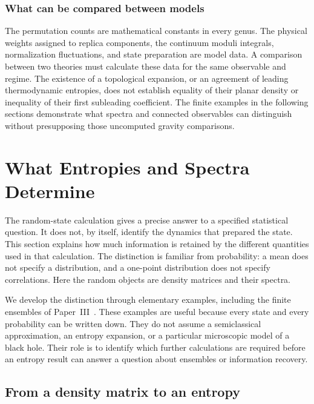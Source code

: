 \documentclass[11pt,letterpaper]{article}
\theoremstyle{plain}
\theoremstyle{definition}
\theoremstyle{remark}
\begin{document}
\subsubsection{What can be compared between models}
The permutation counts are mathematical constants in every genus.  The
physical weights assigned to replica components, the continuum moduli
integrals, normalization fluctuations, and state preparation are model data.
A comparison between two theories must calculate these data for the same
observable and regime.  The existence of a topological expansion, or an
agreement of leading thermodynamic entropies, does not establish equality of
their planar density or inequality of their first subleading coefficient.
The finite examples in the following sections demonstrate what spectra and
connected observables can distinguish without presupposing those uncomputed
gravity comparisons.

\section{What Entropies and Spectra Determine}
\label{sec11:universality_hierarchy}

The random-state calculation gives a precise answer to a specified
statistical question. It does not, by itself, identify the dynamics that
prepared the state. This section explains how much information is retained
by the different quantities used in that calculation. The distinction is
familiar from probability: a mean does not specify a distribution, and a
one-point distribution does not specify correlations. Here the random
objects are density matrices and their spectra.

We develop the distinction through elementary examples, including the
finite ensembles of Paper~III~\citep{wuebben2026paper3}. These examples
are useful because every state and every probability can be written down.
They do not assume a semiclassical approximation, an entropy expansion,
or a particular microscopic model of a black hole. Their role is to
identify which further calculations are required before an entropy result
can answer a question about ensembles or information recovery.

\subsection{From a density matrix to an entropy}
\label{subsec11:thermodynamics_analogy}
\end{document}
